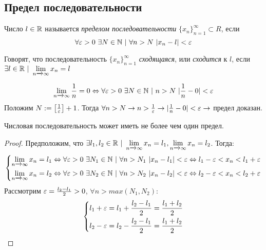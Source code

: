 \subsection{Предел последовательности}

\begin{definition}
    Число $l \in \mathbb{R}$ называется \textit{пределом последовательности} $\{x_n\}_{n = 1}^\infty \subset R$, если
    $$
        \forall \eps > 0\ \exists N \in \N\ |\ \forall n > N\ |x_n - l| < \eps
    $$
\end{definition}

\begin{definition}
    Говорят, что последовательность $\{x_n\}_{n = 1}^\infty$ \textit{сходящаяся}, или \textit{сходится} к $l$, если $\exists l \in \mathbb{R}\ |\ \lim\limits_{n \xrightarrow{} \infty} x_n = l$
\end{definition}

\begin{example}
    $$
        \liml_{n \xrightarrow{} \infty} \frac{1}{n} = 0 \lra \forall \eps > 0\ \exists N \in \N\ |\ n > N\ |\frac{1}{n} - 0| < \eps
    $$
    Положим $N := \left[\frac{1}{\varepsilon}\right] + 1$. Тогда $\forall n > N \rightarrow n > \frac{1}{\varepsilon} \rightarrow |\frac{1}{n} - 0| < \varepsilon \rightarrow$ предел доказан.
\end{example}

\begin{theorem}
    Числовая последовательность может иметь не более чем один предел.
\end{theorem}

\begin{proof}
    Предположим, что $\exists l_1, l_2 \in \mathbb{R}\ |\ \lim\limits_{n \xrightarrow{} \infty} x_n = l_1, \lim\limits_{n \xrightarrow{} \infty} x_n = l_2$. Тогда:
    $$
        \left\{\begin{aligned}
        \lim\limits_{n \xrightarrow{} \infty} x_n = l_1 \Leftrightarrow \forall \varepsilon > 0\ \exists N_1 \in \mathbb{N}\ |\ \forall n > N_1\ |x_n - l_1| < \varepsilon \Leftrightarrow l_1 - \varepsilon < x_n < l_1 + \varepsilon
        \\
        \lim\limits_{n \xrightarrow{} \infty} x_n = l_2 \Leftrightarrow \forall \varepsilon > 0\ \exists N_2 \in \mathbb{N}\ |\ \forall n > N_2\ |x_n - l_2| < \varepsilon \Leftrightarrow l_2 - \varepsilon < x_n < l_2 + \varepsilon
        \end{aligned}\right.
    $$
    Рассмотрим $\varepsilon = \frac{l_2 - l_1}{2} > 0$, $\forall n > max(N_1, N_2)$:
    $$
        \left\{\begin{aligned}
        l_1 + \varepsilon = l_1 + \frac{l_2 - l_1}{2} = \frac{l_1 + l_2}{2}
        \\
        l_2 - \varepsilon = l_2 - \frac{l_2 - l_1}{2} = \frac{l_1 + l_2}{2}
        \end{aligned}\right.
    $$
\end{proof}

